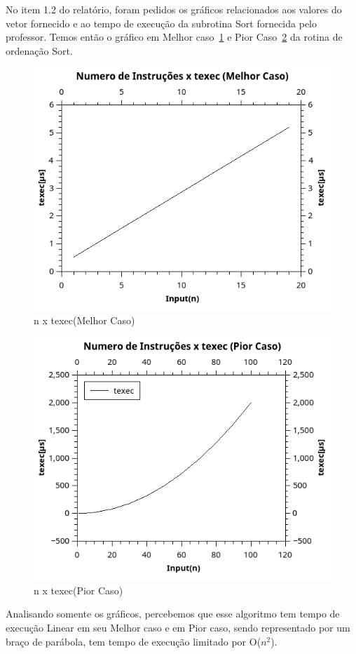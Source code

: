 \documentclass[12pt]{article}
\begin{document}
No item 1.2 do relatório, foram pedidos os gráficos relacionados aos valores do vetor fornecido e ao tempo de execução da subrotina Sort fornecida pelo professor. Temos então o gráfico em Melhor caso~\ref{fig:txnMC} e Pior Caso~\ref{fig:txnPC} da rotina de ordenação Sort.

\begin{figure}[H]
	\centering
	\includegraphics[width=.8\textwidth]{txnMC.png}
	\caption{n x texec(Melhor Caso)}
	\label{fig:txnMC}
\end{figure}

\begin{figure}[H]
	\centering
	\includegraphics[width=.8\textwidth]{txnPC.png}
	\caption{n x texec(Pior Caso)}
	\label{fig:txnPC}
\end{figure}

Analisando somente os gráficos, percebemos que esse algoritmo tem tempo de execução Linear em seu Melhor caso e em Pior caso, sendo representado por um braço de parábola, tem tempo de execução limitado por O(\(n^2\)).
\end{document}
